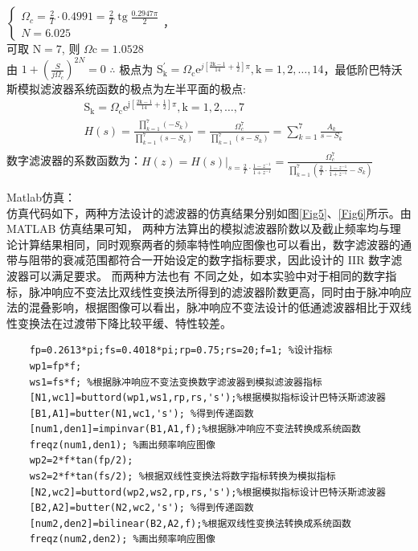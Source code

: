 \documentclass{seuer}
\begin{document}
\begin{enumerate}
	$\left\{\begin{array}{l}\Omega_c=\frac{2}{T} \cdot 0.4991=\frac{2}{T} \operatorname{tg} \frac{0.2947 \pi}{2} \\ N=6.025\end{array}\right.$，\\可取 $\mathrm{N}=7$, 则 $\Omega \mathrm{c}=1.0528$
	\\由 $1+\left(\frac{S}{j \Omega_c}\right)^{2 N}=0$
	$\therefore$ 极点为 $\mathrm{S}_{\mathrm{k}}^{\prime}=\Omega_{\mathrm{c}} \mathrm{e}^{j\left[\frac{\mathrm{2k}-1}{14}+\frac{1}{2}\right] \pi}, \mathrm{k}=1,2, \ldots, 14$，最低阶巴特沃斯模拟滤波器系统函数的极点为左半平面的极点:
	$$
	\begin{aligned}
		& \mathrm{S}_{\mathrm{k}}=\Omega_{\mathrm{c}} \mathrm{e}^{\mathrm{j}\left[\frac{2 \mathrm{k}-1}{14}+\frac{1}{2}\right] \pi}, \mathrm{k}=1,2, \ldots, 7 \\
		&H(s)=\frac{\prod_{k=1}^7(-S_k)}{\prod_{k=1}^7(s-S_k)}=\frac{\Omega_c^7}{\prod_{k=1}^7(s-S_k)}=\sum_{k=1}^7 \frac{A_k}{s-S_k} \\
	\end{aligned}
	$$
	数字滤波器的系数函数为：$ H(z)=\left.H(s)\right|_{s=\frac{2}{T} \cdot \frac{1-z^{-1}}{1+z^{-1}}}=\frac{\Omega_c^7}{\prod_{k=1}^7\left(\frac{2}{T} \cdot \frac{1-z^{-1}}{1+z^{-1}}-S_k\right)}$
\end{enumerate}
Matlab仿真：
\\仿真代码如下，两种方法设计的滤波器的仿真结果分别如图\ref{Fig5}、\ref{Fig6}所示。由 MATLAB 仿真结果可知， 两种方法算出的模拟滤波器阶数以及截止频率均与理论计算结果相同，同时观察两者的频率特性响应图像也可以看出，数字滤波器的通带与阻带的衰减范围都符合一开始设定的数字指标要求，因此设计的 IIR 数字滤波器可以满足要求。 而两种方法也有
不同之处，如本实验中对于相同的数字指标，脉冲响应不变法比双线性变换法所得到的滤波器阶数更高，同时由于脉冲响应法的混叠影响，根据图像可以看出，脉冲响应不变法设计的低通滤波器相比于双线性变换法在过渡带下降比较平缓、特性较差。
\lstset{language=Matlab}
\begin{lstlisting}
	fp=0.2613*pi;fs=0.4018*pi;rp=0.75;rs=20;f=1; %设计指标
	wp1=fp*f;
	ws1=fs*f; %根据脉冲响应不变法变换数字滤波器到模拟滤波器指标
	[N1,wc1]=buttord(wp1,ws1,rp,rs,'s');%根据模拟指标设计巴特沃斯滤波器
	[B1,A1]=butter(N1,wc1,'s'); %得到传递函数
	[num1,den1]=impinvar(B1,A1,f);%根据脉冲响应不变法转换成系统函数
	freqz(num1,den1); %画出频率响应图像
	wp2=2*f*tan(fp/2);
	ws2=2*f*tan(fs/2); %根据双线性变换法将数字指标转换为模拟指标
	[N2,wc2]=buttord(wp2,ws2,rp,rs,'s');%根据模拟指标设计巴特沃斯滤波器
	[B2,A2]=butter(N2,wc2,'s'); %得到传递函数
	[num2,den2]=bilinear(B2,A2,f);%根据双线性变换法转换成系统函数
	freqz(num2,den2); %画出频率响应图像
\end{lstlisting}
\end{document}
